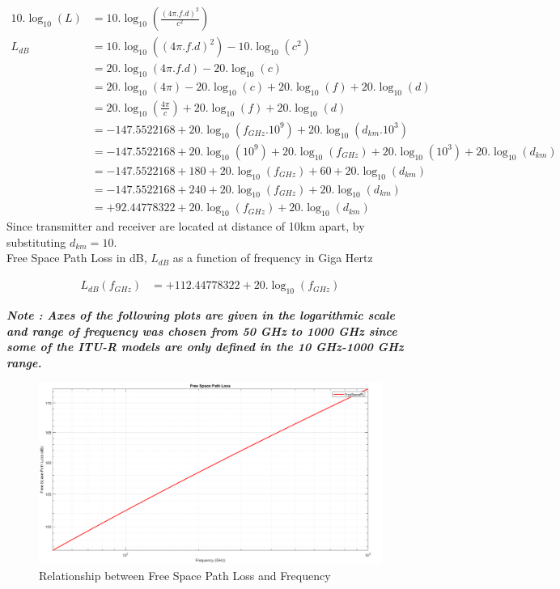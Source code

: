 \documentclass[a4paper,11pt]{article}%
\begin{document}
\[
\begin{split}
10.\log_{10}(L) &= 10.\log_{10}(\frac{(4\pi.f.d)^2}{c^2})\\
L_{dB}& = 10.\log_{10}((4\pi.f.d)^2) - 10.\log_{10}(c^2)\\
&=20.\log_{10}(4\pi.f.d)-20.\log_{10}(c)\\
&=20.\log_{10}(4\pi)-20.\log_{10}(c) + 20.\log_{10}(f) + 20.\log_{10}(d)\\
&=20.\log_{10}(\frac{4\pi}{c}) + 20.\log_{10}(f) + 20.\log_{10}(d)\\
&= -147.5522168 + 20.\log_{10}(f_{GHz}.10^9) + 20.\log_{10}(d_{km}.10^3)\\
& = -147.5522168 + 20.\log_{10}(10^9)+ 20.\log_{10}(f_{GHz}) + 20.\log_{10}(10^3) + 20.\log_{10}(d_{km})\\
&= -147.5522168 + 180+ 20.\log_{10}(f_{GHz}) + 60 + 20.\log_{10}(d_{km})\\
&= -147.5522168 + 240+ 20.\log_{10}(f_{GHz}) + 20.\log_{10}(d_{km})\\
&= +92.44778322+20.\log_{10}(f_{GHz}) + 20.\log_{10}(d_{km})
\end{split}
\]
Since transmitter and receiver are located at distance of 10km apart, by substituting $d_{km}= 10$.\\

Free Space Path Loss in dB, $L_{dB}$ as a function of frequency in Giga Hertz

\[
\begin{split}
L_{dB}(f_{GHz})&=  +112.44778322+20.\log_{10}(f_{GHz})
\end{split}
\]

\textbf{\textit{Note : Axes of the following plots are given in the logarithmic scale and range of frequency was chosen from 50 GHz to 1000 GHz since some of the ITU-R models are only defined in the 10 GHz-1000 GHz range.}}

\begin{figure}[!h]
	\centering
	\includegraphics[scale=0.35]{figures/FreeSpacePL.png}
	\caption{Relationship between Free Space Path Loss and Frequency}
\end{figure}
\end{document}
